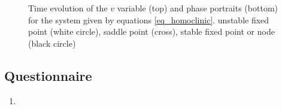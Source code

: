 \documentclass{article}
\begin{document}
\begin{figure}[h]
    \centering
    \caption{Time evolution of the $v$ variable (top) and phase portraits (bottom) for the system given by equations \ref{eq_homoclinic}.
    unstable fixed point (white circle), saddle point (cross), stable fixed point or node (black circle)} 
    \label{fig_homoclinic}
\end{figure}
\subsection{Questionnaire}
\begin{enumerate}
\item 
\end{enumerate}
\end{document}
